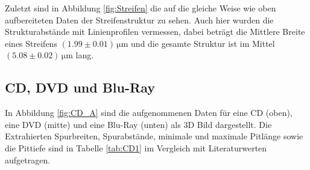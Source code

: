 Zuletzt sind in Abbildung \ref{fig:Streifen} die auf die gleiche Weise wie oben aufbereiteten Daten der Streifenstruktur zu sehen.
Auch hier wurden die Strukturabstände mit Linienprofilen vermessen, dabei beträgt die Mittlere Breite eines Streifens $(1.99\pm 0.01)\,\si{\micro\meter}$ und 
die gesamte Struktur ist im Mittel $(5.08\pm 0.02)\,\si{\micro\meter}$ lang. 



\subsection{CD, DVD und Blu-Ray}

In Abbildung \ref{fig:CD_A} sind die aufgenommenen Daten für eine CD (oben), eine DVD (mitte) und eine Blu-Ray (unten)
als 3D Bild dargestellt. Die Extrahierten Spurbreiten, Spurabstände, minimale und maximale Pitlänge sowie die Pittiefe 
sind in Tabelle \ref{tab:CD1} im Vergleich mit Literaturwerten aufgetragen.

